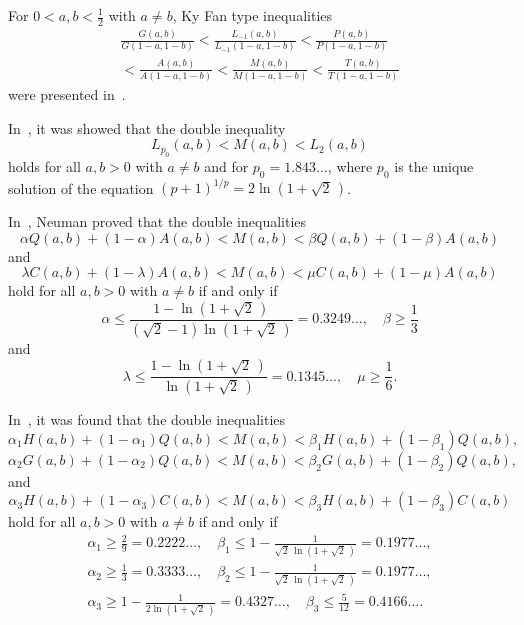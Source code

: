 \documentclass[reqno,a4paper]{amsart}
\numberwithin{equation}{section}
\theoremstyle{plain}
\theoremstyle{remark}
\begin{document}
For $0<a,b<\frac12$ with $a\ne b$, Ky Fan type inequalities
\begin{multline*}
\frac{G(a,b)}{G(1-a,1-b)}<\frac{L_{-1}(a,b)}{L_{-1}(1-a,1-b)}<\frac{P(a,b)}{P(1-a,1-b)}\\
<\frac{A(a,b)}{A(1-a,1-b)}
<\frac{M(a,b)}{M(1-a,1-b)}<\frac{T(a,b)}{T(1-a,1-b)}
\end{multline*}
were presented in~\cite[Proposition~2.2]{Neuman-M-Def}.
\par
In~\cite{L-L-C-NS}, it was showed that the double inequality
\begin{equation*}
L_{p_0}(a,b)<M(a,b)<L_2(a,b)
\end{equation*}
holds for all $a,b>0$ with $a\ne b$ and for $p_0=1.843\dotsc$, where $p_0$ is the unique solution of the
equation $(p+1)^{1/p}=2\ln(1+\sqrt2\,)$.\par
In~\cite{Neuman-note}, Neuman proved that the double inequalities
\begin{equation*}
\alpha Q(a,b)+(1-\alpha)A(a,b)<M(a,b)<\beta Q(a,b)+(1-\beta)A(a,b)
\end{equation*}
and
\begin{equation}\label{Neuman-eq2}
\lambda C(a,b)+(1-\lambda)A(a,b)<M(a,b)<\mu C(a,b)+(1-\mu)A(a,b)
\end{equation}
hold for all $a,b>0$ with $a\ne b$ if and only if
\begin{equation*}
\alpha\le\frac{1-\ln(1+\sqrt2\,)}{(\sqrt2-1)\ln(1+\sqrt2\,)}=0.3249\dotsc,\quad
\beta\ge\frac13
\end{equation*}
and
\begin{equation*}
\lambda\le\frac{1-\ln(1+\sqrt2\,)}{\ln(1+\sqrt2\,)}=0.1345\dotsc,\quad
\mu\ge\frac16.
\end{equation*}
\par
In~\cite[Theorems~1.1 to~1.3]{Z-C-L-optimal}, it was found that the double inequalities
\begin{equation*}
\alpha_1 H(a,b)+(1-\alpha_1)Q(a,b)<M(a,b)<\beta_1 H(a,b)+(1-\beta_1)Q(a,b),
\end{equation*}
\begin{equation*}
\alpha_2 G(a,b)+(1-\alpha_2)Q(a,b)<M(a,b)<\beta_2 G(a,b)+(1-\beta_2)Q(a,b),
\end{equation*}
and
\begin{equation}\label{zhao-eq1}
\alpha_3 H(a,b)+(1-\alpha_3)C(a,b)<M(a,b)<\beta_3 H(a,b)+(1-\beta_3)C(a,b)
\end{equation}
hold for all $a,b>0$ with $a\ne b$ if and only if
\begin{gather*}
\alpha_1\ge\frac29=0.2222\dotsc,\quad
\beta_1\le1-\frac1{\sqrt2\,\ln(1+\sqrt2\,)}=0.1977\dotsc, \\
\alpha_2\ge\frac13=0.3333\dotsc,\quad
\beta_2\le1-\frac1{\sqrt2\,\ln(1+\sqrt2\,)}=0.1977\dotsc,\\
\alpha_3\ge1-\frac1{2\ln(1+\sqrt2\,)}=0.4327\dotsc, \quad\beta_3\le\frac5{12}=0.4166\dotsc.
\end{gather*}
\end{document}
